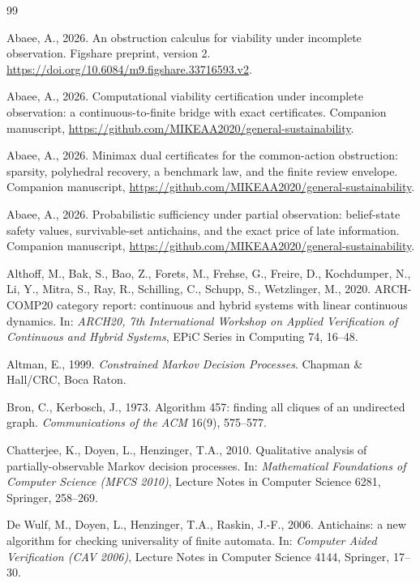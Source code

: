 \documentclass[11pt,a4paper]{article}
\theoremstyle{plain}
\theoremstyle{definition}
\theoremstyle{remark}
\begin{document}
\begin{thebibliography}{99}\footnotesize

 Abaee, A., 2026. An obstruction calculus for viability under incomplete observation. Figshare preprint, version 2. \url{https://doi.org/10.6084/m9.figshare.33716593.v2}.

 Abaee, A., 2026. Computational viability certification under incomplete observation: a continuous-to-finite bridge with exact certificates. Companion manuscript, \url{https://github.com/MIKEAA2020/general-sustainability}.

 Abaee, A., 2026. Minimax dual certificates for the common-action obstruction: sparsity, polyhedral recovery, a benchmark law, and the finite review envelope. Companion manuscript, \url{https://github.com/MIKEAA2020/general-sustainability}.

 Abaee, A., 2026. Probabilistic sufficiency under partial observation: belief-state safety values, survivable-set antichains, and the exact price of late information. Companion manuscript, \url{https://github.com/MIKEAA2020/general-sustainability}.

 Althoff, M., Bak, S., Bao, Z., Forets, M., Frehse, G., Freire, D., Kochdumper, N., Li, Y., Mitra, S., Ray, R., Schilling, C., Schupp, S., Wetzlinger, M., 2020. ARCH-COMP20 category report: continuous and hybrid systems with linear continuous dynamics. In: \emph{ARCH20, 7th International Workshop on Applied Verification of Continuous and Hybrid Systems}, EPiC Series in Computing 74, 16--48.

 Altman, E., 1999. \emph{Constrained Markov Decision Processes}. Chapman \& Hall/CRC, Boca Raton.

 Bron, C., Kerbosch, J., 1973. Algorithm 457: finding all cliques of an undirected graph. \emph{Communications of the ACM} 16(9), 575--577.

 Chatterjee, K., Doyen, L., Henzinger, T.A., 2010. Qualitative analysis of partially-observable Markov decision processes. In: \emph{Mathematical Foundations of Computer Science (MFCS 2010)}, Lecture Notes in Computer Science 6281, Springer, 258--269.

 De Wulf, M., Doyen, L., Henzinger, T.A., Raskin, J.-F., 2006. Antichains: a new algorithm for checking universality of finite automata. In: \emph{Computer Aided Verification (CAV 2006)}, Lecture Notes in Computer Science 4144, Springer, 17--30.


\end{thebibliography}
\end{document}
